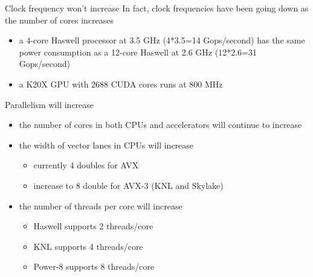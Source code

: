 \documentclass[aspectratio=43]{beamer}
\begin{document}
\begin{frame}[fragile]{}
    \begin{info}{Clock frequency won't increase}
        In fact, clock frequencies have been going down as the number of cores increases
        \begin{itemize}
            \item a 4-core Haswell processor at 3.5 GHz (4*3.5=14 Gops/second) has the same power consumption as a 12-core Haswell at 2.6 GHz (12*2.6=31 Gops/second)
            \item a K20X GPU with 2688 CUDA cores runs at 800 MHz
        \end{itemize}
    \end{info}
\end{frame}

\begin{frame}[fragile]{}
    \begin{info}{Parallelism will increase}
        \begin{itemize}
            \item the number of cores in both CPUs and accelerators will continue to increase
            \item the width of vector lanes in CPUs will increase
            \begin{itemize}
                \item currently 4 doubles for AVX
                \item increase to 8 double for AVX-3 (KNL and Skylake)
            \end{itemize}
            \item the number of threads per core will increase
            \begin{itemize}
                \item Haswell supports 2 threads/core
                \item KNL supports 4 threads/core
                \item Power-8 supports 8 threads/core
            \end{itemize}
        \end{itemize}
    \end{info}
\end{frame}
\end{document}
